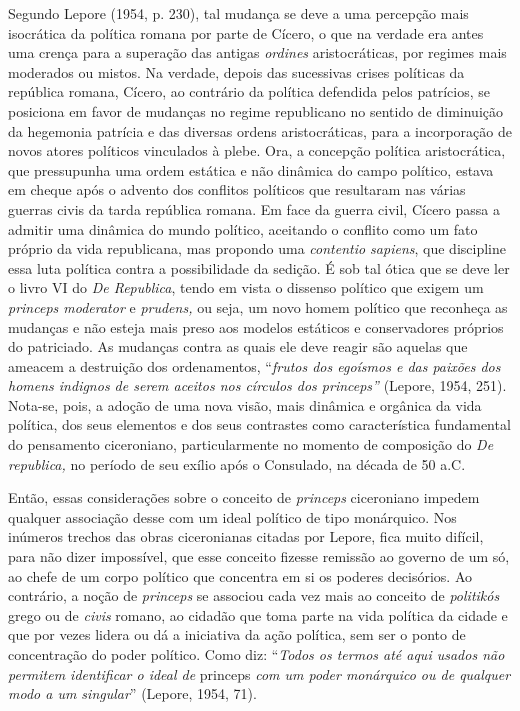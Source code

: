 Segundo Lepore (1954, p. 230), tal mudança se deve a uma percepção mais
isocrática da política romana por parte de Cícero, o que na verdade era
antes uma crença para a superação das antigas \emph{ordines}
aristocráticas, por regimes mais moderados ou mistos. Na verdade, depois
das sucessivas crises políticas da república romana, Cícero, ao
contrário da política defendida pelos patrícios, se posiciona em favor
de mudanças no regime republicano no sentido de diminuição da hegemonia
patrícia e das diversas ordens aristocráticas, para a incorporação de
novos atores políticos vinculados à plebe. Ora, a concepção política
aristocrática, que pressupunha uma ordem estática e não dinâmica do
campo político, estava em cheque após o advento dos conflitos políticos
que resultaram nas várias guerras civis da tarda república romana. Em
face da guerra civil, Cícero passa a admitir uma dinâmica do mundo
político, aceitando o conflito como um fato próprio da vida republicana,
mas propondo uma \emph{contentio sapiens}, que discipline essa luta
política contra a possibilidade da sedição. É sob tal ótica que se deve
ler o livro VI do \emph{De Republica}, tendo em vista o dissenso
político que exigem um \emph{princeps moderator} e \emph{prudens,} ou
seja, um novo homem político que reconheça as mudanças e não esteja mais
preso aos modelos estáticos e conservadores próprios do patriciado. As
mudanças contra as quais ele deve reagir são aquelas que ameacem a
destruição dos ordenamentos, ``\emph{frutos dos egoísmos e das paixões
dos homens indignos de serem aceitos nos círculos dos princeps''}
(Lepore, 1954, 251). Nota-se, pois, a adoção de uma nova visão, mais
dinâmica e orgânica da vida política, dos seus elementos e dos seus
contrastes como característica fundamental do pensamento ciceroniano,
particularmente no momento de composição do \emph{De republica,} no
período de seu exílio após o Consulado, na década de 50 a.C.

Então, essas considerações sobre o conceito de \emph{princeps}
ciceroniano impedem qualquer associação desse com um ideal político de
tipo monárquico. Nos inúmeros trechos das obras ciceronianas citadas por
Lepore, fica muito difícil, para não dizer impossível, que esse conceito
fizesse remissão ao governo de um só, ao chefe de um corpo político que
concentra em si os poderes decisórios. Ao contrário, a noção de
\emph{princeps} se associou cada vez mais ao conceito de
\emph{politikós} grego ou de \emph{civis} romano, ao cidadão que toma
parte na vida política da cidade e que por vezes lidera ou dá a
iniciativa da ação política, sem ser o ponto de concentração do poder
político. Como diz: ``\emph{Todos os termos até aqui usados não permitem
identificar o ideal de} princeps \emph{com um poder monárquico ou de
qualquer modo a um singular}'' (Lepore, 1954, 71).


